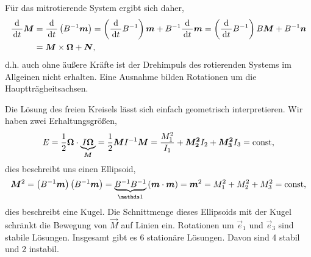 Für das mitrotierende System ergibt sich daher,
\begin{align*}
\frac{\mathrm{d}}{\,\mathrm{d} t\,} \bm{M} &= \frac{\mathrm{d}}{\,\mathrm{d} t\,}\left(B^{-1}\bm{m} \right)
= \left(\frac{\mathrm{d}}{\,\mathrm{d} t\,}B^{-1}\right)\bm{m} +
B^{-1}\frac{\mathrm{d}}{\,\mathrm{d} t\,}\bm{m} =\left(\frac{\mathrm{d}}{\,\mathrm{d} t\,}B^{-1}\right)B\bm{M}
+ B^{-1}\bm{n} \\ &= \bm{M}\times \bm{\Omega} + \bm{N},
\end{align*}
d.h. auch ohne äußere Kräfte ist der Drehimpuls des rotierenden Systems im
Allgeinen nicht erhalten. Eine Ausnahme bilden Rotationen um die
Hauptträgheitsachsen.

Die Lösung des freien Kreisels lässt sich einfach geometrisch interpretieren.
Wir haben zwei Erhaltungsgrößen,
\begin{align*}
E = \frac{1}{2}\bm{\Omega}\cdot \underbrace{I\bm{\Omega}}_{\bm{M}} =
\frac{1}{2}\bm{M}I^{-1}\bm{M} = \frac{M_1^2}{I_1} + \bm{M_2^2}{I_2} +
\bm{M_3^2}{I_3} = \mathrm{const},
\end{align*}
dies beschreibt uns einen Ellipsoid,
\begin{align*}
\vec{M}^2 = \left(B^{-1}\vec{m}\right)\left(B^{-1}\vec{m}\right) =
\underbrace{B^{-1}B^{-1}}_{\Id}\left(\vec{m}\cdot\vec{m}\right) = \vec{m}^2
= M_1^2 + M_2^2 + M_3^2 = \const,
\end{align*}
dies beschreibt eine Kugel. Die Schnittmenge dieses Ellipsoids mit der Kugel
schränkt die Bewegung von $\vec{M}$ auf Linien ein.
Rotationen um $\vec{e}_1$ und $\vec{e}_3$ sind stabile Lösungen. Insgesamt gibt
es 6 stationäre Lösungen. Davon sind 4 stabil und 2 instabil.